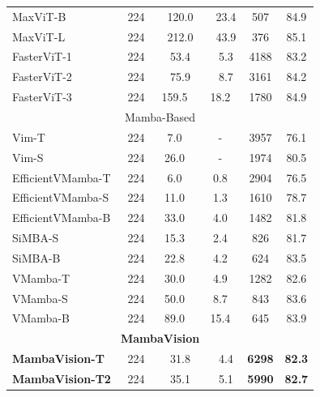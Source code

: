 \documentclass[10pt,twocolumn,letterpaper]{article}
\begin{document}
\begin{table}[t]
{{\begin{tabular}[t]{lccccc}
MaxViT-B~\cite{tu2022maxvit} & 224 &\ \  120.0 & \ \ 23.4 & 507 & 84.9\\
MaxViT-L~\cite{tu2022maxvit} & 224 &\ \  212.0 & \ \ 43.9 & 376 & 85.1\\
FasterViT-1~\cite{hatamizadeh2023fastervit} &  224 &\ \  53.4 &\ \  5.3 & 4188 &  83.2\\
FasterViT-2~\cite{hatamizadeh2023fastervit} &  224 &\ \  75.9 &\ \  8.7 & 3161 &  84.2 \\
FasterViT-3~\cite{hatamizadeh2023fastervit} &  224 & 159.5 & 18.2 & 1780 &  84.9 \\

\midrule
\multicolumn{6}{c}{Mamba-Based} \\
\midrule
Vim-T~\cite{zhu2024vision} & 224 & 7.0 & - & 3957 & 76.1\\
Vim-S~\cite{zhu2024vision} & 224 & 26.0 & - & 1974 & 80.5\\
EfficientVMamba-T~\cite{pei2024efficientvmamba} & 224 &6.0 & 0.8 & 2904 & 76.5\\
EfficientVMamba-S~\cite{pei2024efficientvmamba} & 224 &11.0 & 1.3 & 1610 & 78.7\\
EfficientVMamba-B~\cite{pei2024efficientvmamba} & 224 &33.0 & 4.0 & 1482 & 81.8\\
SiMBA-S~\cite{patro2024simba} & 224 & 15.3 & 2.4 & 826 & 81.7\\
SiMBA-B~\cite{patro2024simba} & 224 & 22.8 & 4.2 & 624 & 83.5\\
VMamba-T~\cite{liu2024vmamba} & 224 &30.0 & 4.9 & 1282 & 82.6\\
VMamba-S~\cite{liu2024vmamba} & 224 &50.0 & 8.7 & 843 & 83.6\\
VMamba-B~\cite{liu2024vmamba} & 224 &89.0 & 15.4 & 645 & 83.9\\
\midrule
\multicolumn{6}{c}{\textbf{MambaVision}} \\
\midrule
\rowcolor{Gray} 
\textbf{MambaVision-T} & 224 & \ \ 31.8 &\ \  4.4 & \textbf{6298} &  \textbf{82.3} \\
\rowcolor{Gray} 
\textbf{MambaVision-T2} &  224 &\ \  35.1 &\ \  5.1 & \textbf{5990} &  \textbf{82.7}\\

\end{tabular}}}
\end{table}
\end{document}
